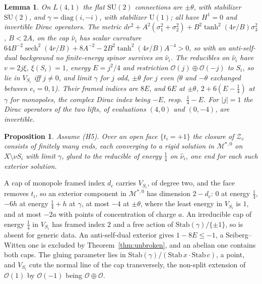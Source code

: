 \documentclass[10pt]{amsart}
\makeatletter
\numberwithin{equation}{section}
\theoremstyle{compact}
\newtheorem{proposition}[theorem]{Proposition}
\newtheorem{lemma}[theorem]{Lemma}
\renewenvironment{proof}[1][\proofname]{\par\pushQED{\qed}\normalfont
  \topsep4\p@\relax\trivlist\item[\hskip\labelsep\itshape#1\@addpunct{.}]%
  \ignorespaces}{\popQED\endtrivlist\@endpefalse}
\newcommand{\SU}{\mathrm{SU}}
\newcommand{\cO}{\mathcal O}
\newcommand{\cM}{\mathcal M}
\newcommand{\cZ}{\mathcal Z}
\newcommand{\Ms}{\cM^{*,0}}
\makeatother
\begin{document}
\begin{lemma}\label{lem:lens}
On $L(4,1)$ the flat $\SU(2)$ connections are $\pm\theta$, with stabilizer
$\SU(2)$, and $\gamma=\mathrm{diag}(i,-i)$, with stabilizer $\mathrm U(1)$; all
have $H^1=0$ and invertible Dirac operators. The metric
$dr^2+A^2(\sigma_1^2+\sigma_2^2)+B^2\tanh^2(4r/B)\sigma_3^2$, $B<2A$, on the cap
$\hat\nu_i$ has scalar curvature
$64B^{-2}\operatorname{sech}^2(4r/B)+8A^{-2}-2B^2\tanh^2(4r/B)A^{-4}>0$, so with
an anti-self-dual background no finite-energy spinor survives on $\hat\nu_i$.
The reducibles on $\hat\nu_i$ have $v=2j\xi$, $\xi(S_i)=1$, energy $E=j^2/4$ and
restriction $\cO(j)\oplus\cO(-j)$ to $S_i$, so lie in $V_{S_i}$ iff $j\ne0$, and
limit $\gamma$ for $j$ odd, $\pm\theta$ for $j$ even ($\theta$ and $-\theta$
exchanged between $e_i=0,1$). Their framed indices are $8E$, and $6E$ at
$\pm\theta$, $2+6(E-\frac14)$ at $\gamma$ for monopoles, the complex Dirac index
being $-E$, resp.\ $\frac14-E$. For $|j|=1$ the Dirac operators of the two
lifts, of evaluations $(4,0)$ and $(0,-4)$, are invertible.
\end{lemma}

\begin{proposition}\label{prop:lensface}
Assume \textup{(H5)}. Over an open face $\{t_i=+1\}$ the closure of $\cZ_e$
consists of finitely many ends, each converging to a rigid solution in $\Ms$ on
$X\setminus\nu S_i$ with limit $\gamma$, glued to the reducible of energy
$\frac14$ on $\hat\nu_i$, one end for each such exterior solution.
\end{proposition}

\begin{proof}[Sketch]
A cap of monopole framed index $d_c$ carries $V_{S_i}$, of degree two, and
the face removes $t_i$, so an exterior component in $\Ms$ has dimension
$2-d_c$: $0$ at energy $\frac14$, $-6h$ at energy $\frac14+h$ at $\gamma$, at
most $-4$ at $\pm\theta$, where the least energy in $V_{S_i}$ is $1$, and at
most $-2a$ with points of concentration of charge $a$. An irreducible cap of
energy $\frac14$ in $V_{S_i}$ has framed index $2$ and a free action of
$\mathrm{Stab}(\gamma)/\{\pm1\}$, so is absent for generic data. An
anti-self-dual exterior gives $1-8E\le-1$, a Seiberg--Witten one is excluded by
Theorem~\ref{thm:unbroken}, and an abelian one contains both caps. The gluing
parameter lies in $\mathrm{Stab}(\gamma)/(\mathrm{Stab}\,x\cdot
\mathrm{Stab}\,c)$, a point, and $V_{S_i}$ cuts the normal line of the cap
transversely, the non-split extension of $\cO(1)$ by $\cO(-1)$ being
$\cO\oplus\cO$.
\end{proof}
\end{document}
